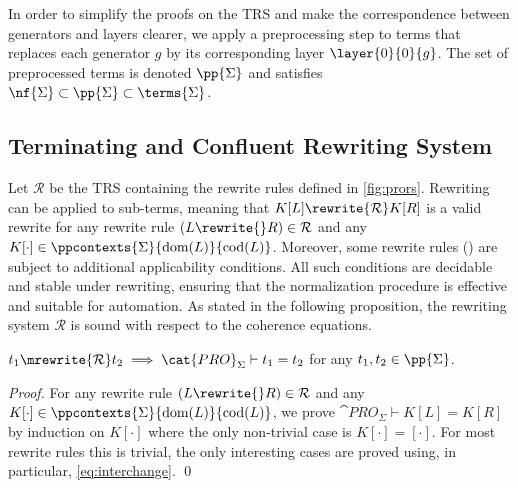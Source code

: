 In order to simplify the proofs on the TRS and make the correspondence between generators and layers clearer, we apply a preprocessing step to terms that replaces each generator $g$ by its corresponding layer $\layer{0}{0}{g}$. The set of preprocessed terms is denoted $\pp{\Sigma}$ and satisfies $\nf{\Sigma}\subset\pp{\Sigma}\subset\terms{\Sigma}$.


\subsection{Terminating and Confluent Rewriting System}

Let $\mathcal{R}$ be the TRS containing the rewrite rules  defined in \cref{fig:prors}. Rewriting can be applied to sub-terms, meaning that $K[L]\rewrite{\mathcal{R}}K[R]$ is a valid rewrite for any rewrite rule $(L\rewrite{}R)\in\mathcal{R}$ and any $K[\cdot]\in\ppcontexts{\Sigma}{\textup{dom}(L)}{\textup{cod}(L)}$. Moreover, some rewrite rules () are subject to additional applicability conditions. All such conditions are decidable and stable under rewriting, ensuring that the normalization procedure is effective and suitable for automation. As stated in the following proposition, the rewriting system $\mathcal{R}$ is sound with respect to the coherence equations.
\begin{proposition}\label{prop:prosoundness}
    $t_1\mrewrite{\mathcal{R}}t_2\implies\cat{PRO}_\Sigma\vdash t_1=t_2$ for any $t_1,t_2\in\pp{\Sigma}$.
\end{proposition}
\begin{proof}
    For any rewrite rule $(L\rewrite{}R)\in\mathcal{R}$ and any $K[\cdot]\in\ppcontexts{\Sigma}{\textup{dom}(L)}{\textup{cod}(L)}$, we prove $\cat{PRO}_\Sigma\vdash K[L]=K[R]$ by induction on $K[\cdot]$ where the only non-trivial case is $K[\cdot]=[\cdot]$. For most rewrite rules this is trivial, the only interesting cases  are proved using, in particular, \cref{eq:interchange}. \qed
\end{proof}

